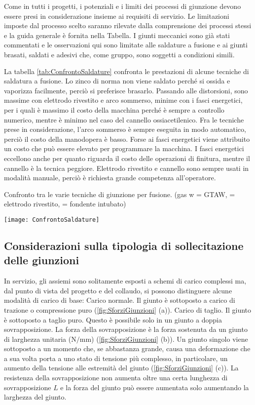 Come in tutti i progetti, i potenziali e i limiti dei processi di giunzione devono essere presi in considerazione insieme ai requisiti di servizio.
Le limitazioni imposte dal processo scelto saranno rilevate dalla comprensione dei processi stessi e la guida generale è fornita nella Tabella.
I giunti meccanici sono già stati commentati e le osservazioni qui sono limitate alle saldature a fusione e ai giunti brasati, saldati e adesivi che, come gruppo, sono soggetti a condizioni simili.

La tabella \ref{tab:ConfrontoSaldature} confronta le prestazioni di alcune tecniche di saldatura a fusione. Lo zinco di norma non viene saldato perché si ossida e vaporizza facilmente, perciò si preferisce brasarlo. Passando alle distorsioni, sono massime con elettrodo rivestito e arco sommerso, minime con i fasci energetici, per i quali è massimo il costo della macchina perché è sempre a controllo numerico, mentre è minimo nel caso del cannello ossiacetilenico. Fra le tecniche prese in considerazione, l'arco sommerso è sempre eseguita in modo automatico, perciò il costo della manodopera è basso. Forse ai fasci energetici viene attribuito un costo che può essere elevato per programmare la macchina. I fasci energetici eccellono anche per quanto riguarda il costo delle operazioni di finitura, mentre il cannello è la tecnica peggiore. Elettrodo rivestito e cannello sono sempre usati in modalità manuale, perciò è richiesta grande competenza all'operatore.

\begin{table}
\centering
\caption{Confronto tra le varie tecniche di giunzione per fusione. (gas w = GTAW,  = elettrodo rivestito,  = fondente intubato)}
\label{tab:ConfrontoSaldature}
\texttt{[image: ConfrontoSaldature]}
\end{table}

\subsection{Considerazioni sulla tipologia di sollecitazione delle giunzioni}
In servizio, gli assiemi sono solitamente esposti a schemi di carico complessi ma, dal punto di vista del progetto e del collaudo, si possono distinguere alcune modalità di carico di base:
Carico normale. Il giunto è sottoposto a carico di trazione o compressione puro (\ref{fig:SforziGiunzioni} (a)).
Carico di taglio. Il giunto è sottoposto a taglio puro. Questo è possibile solo in un giunto a doppia sovrapposizione. La forza della sovrapposizione è la forza sostenuta da un giunto di larghezza unitaria ($\unit{\N/\mm}$) (\ref{fig:SforziGiunzioni} (b)).
Un giunto singolo viene sottoposto a un momento che, se abbastanza grande, causa una deformazione che a sua volta porta a uno stato di tensione più complesso, in particolare, un aumento della tensione alle estremità del giunto (\ref{fig:SforziGiunzioni} (c)).
La resistenza della sovrapposizione non aumenta oltre una certa lunghezza di sovrapposizione $L$ e la forza del giunto può essere aumentata solo aumentando la larghezza del giunto.

